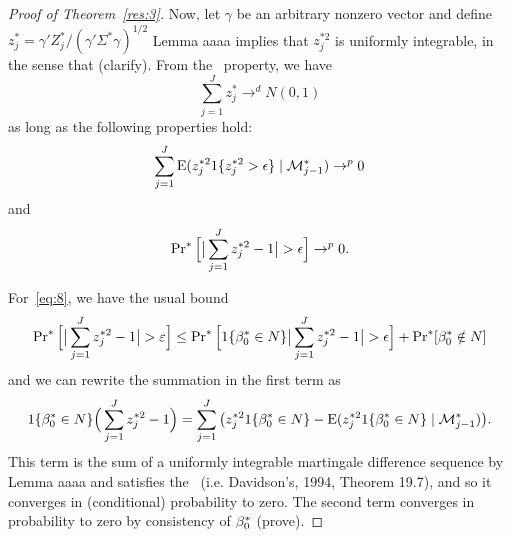 \documentclass[12pt,fleqn]{article}
\begin{document}
\begin{proof}[Proof of Theorem~\ref{res:3}]
  Now, let $\gamma$ be an arbitrary nonzero vector and define $z_j^* =
  \gamma'Z_j^* / (\gamma'\Sigma^*\gamma)^{1/2}$ Lemma aaaa implies
  that $z_j^{*2}$ is uniformly integrable, in the sense that
  (clarify). From the \mds\ property, we have
  \begin{equation*}
    \sum_{j=1}^J z_j^* \to^d N(0, 1)
  \end{equation*}
  as long as the following properties hold:
  \begin{equation}\label{eq:7}
    \sum_{j=1}^J \operatorname{E}(z_j^{*2} 1\{z_j^{*2} > \epsilon\} \mid \mathcal{M}_{j-1}^*) \to^p 0
  \end{equation}
  and
  \begin{equation}\label{eq:8}
    \operatorname{Pr}^*\Big[ \big| \sum_{j=1}^J z_j^{*2} - 1 \big| > \epsilon\Big] \to^p 0.
  \end{equation}

  For~\eqref{eq:8}, we have the usual bound
  \begin{equation*}
    \operatorname{Pr}^*\Big[ \big|\sum_{j=1}^J z_j^{*2} - 1 \big| > \varepsilon\Big] \leq
    \operatorname{Pr}^*\Big[ 1\{\beta_0^* \in N\} \big| \sum_{j=1}^J z_j^{*2} - 1 \big| > \epsilon \Big]
     + \operatorname{Pr}^*[ \beta_0^* \notin N ]
  \end{equation*}
  and we can rewrite the summation in the first term as
  \begin{equation*}
    1\{\beta_0^* \in N\} \Big( \sum_{j=1}^J z_j^{*2} - 1 \Big)
    =  \sum_{j=1}^J \big(z_j^{*2}1\{\beta_0^* \in N\} - \operatorname{E}(z_j^{*2} 1\{\beta_0^* \in N\} \mid \mathcal{M}_{j-1}^*) \big).
   \end{equation*}
   This term is the sum of a uniformly integrable martingale
   difference sequence by Lemma aaaa and satisfies the \lln\
   (i.e. Davidson's, 1994, Theorem 19.7), and so it converges in
   (conditional) probability to zero.
   The second term converges in probability to zero by consistency of $\beta_0^*$ (prove).


\end{proof}
\end{document}
